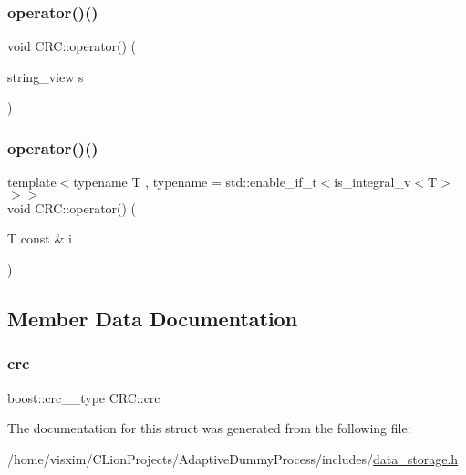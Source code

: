 \mbox{\label{structCRC_a8d02f69866f0cbae7e8b1a41bc9c2d5b}} 
\subsubsection{\texorpdfstring{operator()()}{operator()()}\hspace{0.1cm}{\footnotesize\ttfamily [1/2]}}
{\footnotesize\ttfamily void C\+R\+C\+::operator() (\begin{DoxyParamCaption}\item[{string\+\_\+view}]{s }\end{DoxyParamCaption})\hspace{0.3cm}{\ttfamily [inline]}}

\mbox{\label{structCRC_a3a15630422ed9cdd975336ec7d350beb}} 
\subsubsection{\texorpdfstring{operator()()}{operator()()}\hspace{0.1cm}{\footnotesize\ttfamily [2/2]}}
{\footnotesize\ttfamily template$<$typename T , typename  = std\+::enable\+\_\+if\+\_\+t$<$is\+\_\+integral\+\_\+v$<$\+T$>$$>$$>$ \\
void C\+R\+C\+::operator() (\begin{DoxyParamCaption}\item[{T const \&}]{i }\end{DoxyParamCaption})\hspace{0.3cm}{\ttfamily [inline]}}



\subsection{Member Data Documentation}
\mbox{\label{structCRC_aff4391b2e5fbfad71138bed74eaf5b11}} 
\subsubsection{\texorpdfstring{crc}{crc}}
{\footnotesize\ttfamily boost\+::crc\+\_\+\_\+type C\+R\+C\+::crc}



The documentation for this struct was generated from the following file\+:\begin{DoxyCompactItemize}
\item 
/home/visxim/\+C\+Lion\+Projects/\+Adaptive\+Dummy\+Process/includes/\hyperlink{data__storage_8h}{data\+\_\+storage.\+h}\end{DoxyCompactItemize}
